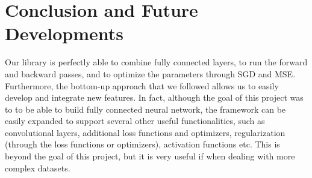 \documentclass[10pt,conference,compsocconf]{IEEEtran}
\begin{document}
\section{Conclusion and Future Developments}
Our library is perfectly able to combine fully connected layers, to run the forward and backward passes, and to optimize the parameters through SGD and MSE.
\\Furthermore, the bottom-up approach that we followed allows us to easily develop and integrate new features. In fact, although the goal of this project was to to be able to build fully connected neural network, the framework can be easily expanded to support several other useful functionalities, such as convolutional layers, additional loss functions and optimizers, regularization (through the loss functions or optimizers), activation functions etc. This is beyond the goal of this project, but it is very useful if when dealing with more complex datasets.
\end{document}
